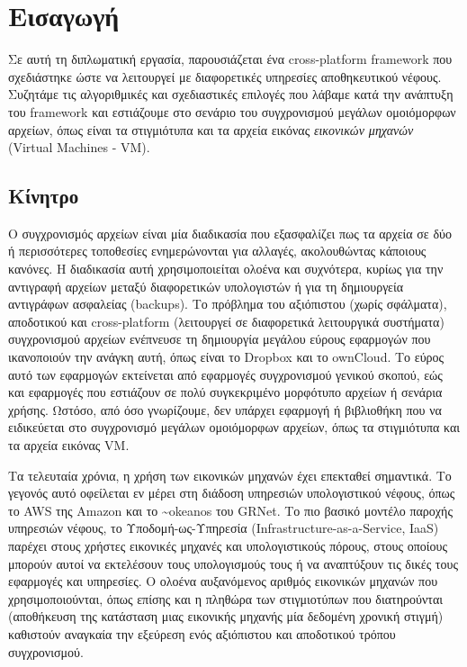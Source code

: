 
\chapter{Εισαγωγή}
Σε αυτή τη διπλωματική εργασία, παρουσιάζεται ένα cross-platform framework που σχεδιάστηκε ώστε να λειτουργεί με διαφορετικές υπηρεσίες αποθηκευτικού νέφους. Συζητάμε τις αλγοριθμικές και σχεδιαστικές επιλογές που λάβαμε κατά την ανάπτυξη του framework και εστιάζουμε στο σενάριο του συγχρονισμού μεγάλων ομοιόμορφων αρχείων, όπως είναι τα στιγμιότυπα και τα αρχεία εικόνας \emph{εικονικών μηχανών} (Virtual Machines - VM).

\section{Κίνητρο}
  Ο συγχρονισμός αρχείων είναι μία διαδικασία που εξασφαλίζει πως τα αρχεία σε δύο ή περισσότερες τοποθεσίες ενημερώνονται για αλλαγές, ακολουθώντας κάποιους κανόνες. Η διαδικασία αυτή χρησιμοποιείται ολοένα και συχνότερα, κυρίως για την αντιγραφή αρχείων μεταξύ διαφορετικών υπολογιστών ή για τη δημιουργεία αντιγράφων ασφαλείας (backups). Το πρόβλημα του αξιόπιστου (χωρίς σφάλματα), αποδοτικού και cross-platform (λειτουργεί σε διαφορετικά λειτουργικά συστήματα) συγχρονισμού αρχείων ενέπνευσε τη δημιουργία μεγάλου εύρους εφαρμογών που ικανοποιούν την ανάγκη αυτή, όπως είναι το Dropbox και το ownCloud. Το εύρος αυτό των εφαρμογών εκτείνεται από εφαρμογές συγχρονισμού γενικού σκοπού, εώς και εφαρμογές που εστιάζουν σε πολύ συγκεκριμένο μορφότυπο αρχείων ή σενάρια χρήσης. Ωστόσο, από όσο γνωρίζουμε, δεν υπάρχει εφαρμογή ή βιβλιοθήκη που να ειδικεύεται στο συγχρονισμό μεγάλων ομοιόμορφων αρχείων, όπως τα στιγμιότυπα και τα αρχεία εικόνας VM.

  Τα τελευταία χρόνια, η χρήση των εικονικών μηχανών έχει επεκταθεί σημαντικά. Το γεγονός αυτό οφείλεται εν μέρει στη διάδοση υπηρεσιών υπολογιστικού νέφους, όπως το AWS της Amazon και το \textasciitilde okeanos του GRNet. Το πιο βασικό μοντέλο παροχής υπηρεσιών νέφους, το Υποδομή-ως-Υπηρεσία (Infrastructure-as-a-Service, IaaS) παρέχει στους χρήστες εικονικές μηχανές και υπολογιστικούς πόρους, στους οποίους μπορούν αυτοί να εκτελέσουν τους υπολογισμούς τους ή να αναπτύξουν τις δικές τους εφαρμογές και υπηρεσίες. Ο ολοένα αυξανόμενος αριθμός εικονικών μηχανών που χρησιμοποιούνται, όπως επίσης και η πληθώρα των στιγμιοτύπων που διατηρούνται (αποθήκευση της κατάσταση μιας εικονικής μηχανής μία δεδομένη χρονική στιγμή) καθιστούν αναγκαία την εξεύρεση ενός αξιόπιστου και αποδοτικού τρόπου συγχρονισμού.

